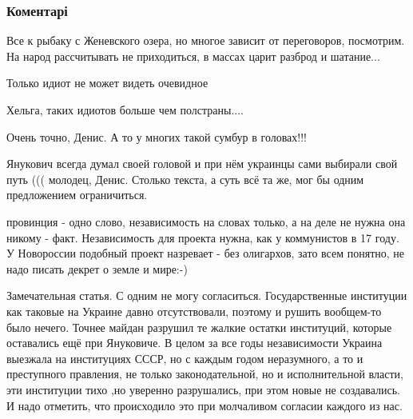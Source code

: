  
 
 
 
 
\subsubsection{Коментарі}

\begin{itemize} %

Все к рыбаку с Женевского озера, но многое зависит от переговоров, посмотрим. На
народ рассчитывать не приходиться, в массах царит разброд и шатание...

Только идиот не может видеть очевидное

Хельга, таких идиотов больше чем полстраны....

Очень точно, Денис. А то у многих такой сумбур в головах!!!


Янукович всегда думал своей головой и при нём украинцы сами выбирали свой путь
((( молодец, Денис. Столько текста, а суть всё та же, мог бы одним предложением
ограничиться.


провинция - одно слово, независимость на словах только, а на деле не нужна она
никому - факт. Независимость для проекта нужна, как у коммунистов в 17 году. У
Новороссии подобный проект назревает - без олигархов, зато всем понятно, не
надо писать декрет о земле и мире:-)


Замечательная статья. С одним не могу согласиться. Государственные институции как
таковые на Украине давно отсутствовали, поэтому и рушить вообщем-то было
нечего. Точнее майдан разрушил те жалкие остатки институций, которые оставались
ещё при Януковиче. В целом за все годы независимости Украина выезжала на
институциях СССР, но с каждым годом неразумного, а то и преступного правления, не
только законодательной, но и исполнительной власти, эти институции тихо ,но
уверенно разрушались, при этом новые не создавались. И надо отметить, что
происходило это при молчаливом согласии каждого из нас.


\end{itemize}
